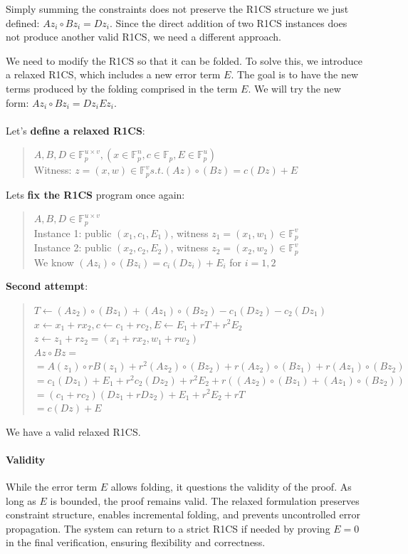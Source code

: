 Simply summing the constraints does not preserve the R1CS structure we just defined: $Az_i \circ Bz_i = Dz_i$.
Since the direct addition of two R1CS instances does not produce another valid R1CS, we need a different approach.

We need to modify the R1CS so that it can be folded.
To solve this, we introduce a relaxed R1CS, which includes a new error term $E$.
The goal is to have the new terms produced by the folding comprised in the term $E$.
We will try the new form: $Az_i \circ Bz_i = Dz_i Ez_i$.
\\
\\
Let's \textbf{define a relaxed R1CS}:
\begin{quote}
$A, B,D \in \mathbb{F}^{u \times v}_p, (x \in  \mathbb{F}^n_p, c \in \mathbb{F}_p, E \in \mathbb{F}^u_p) $
\\
Witness: $ z = (x,w) \in \mathbb{F}^v_p s.t. (Az) \circ (Bz) = c(Dz) + E$
\end{quote}
Lets \textbf{fix the R1CS} program once again:
\begin{quote}
$A,B,D \in \mathbb{F}^{u \times v}_p $
\\
Instance 1: public $ (x_1,c_1,E_1)$, witness $z_1 = (x_1, w_1) \in \mathbb{F}^v_p$
\\
Instance 2: public $(x_2,c_2,E_2)$, witness $ z_2 = (x_2, w_2) \in \mathbb{F}^v_p$
\\
We know $(Az_i) \circ (Bz_i) = c_i(Dz_i) + E_i$ for $ i = 1,2$
\end{quote}


\textbf{Second attempt}:
\begin{quote}
$T \leftarrow (Az_2) \circ (Bz_1) + (Az_1) \circ (Bz_2) - c_1(Dz_2) - c_2(Dz_1)$
\\
$x \leftarrow x_1 + rx_2, c \leftarrow c_1 + rc_2, E \leftarrow E_1 + rT +r^2E_2$
\\
$z \leftarrow z_1 + rz_2 = (x_1 +rx_2, w_1 + rw_2)$
\\
$Az \circ Bz = $
\\
$=A(z_1) \circ rB(z_1) +r^2(Az_2) \circ (Bz_2) + r(Az_2) \circ (Bz_1) + r(Az_1) \circ (Bz_2)$
\\
$=c_1(Dz_1) + E_1 + r^2c_2(Dz_2) + r^2E_2+r((Az_2) \circ (Bz_1) + (Az_1) \circ (Bz_2))$
\\
$=(c_1+rc_2)(Dz_1+rDz_2)+E_1+r^2E_2+rT$
\\
$=c(Dz) + E$
\end{quote}
We have a valid relaxed R1CS.

\paragraph{Validity}
While the error term $E$ allows folding, it questions the validity of the proof. As long as $E$ is bounded, the proof remains valid. 
The relaxed formulation preserves constraint structure, enables incremental folding, and prevents uncontrolled error propagation. 
The system can return to a strict R1CS if needed by proving $E = 0$ in the final verification, ensuring flexibility and correctness.
\cite{Nova23}